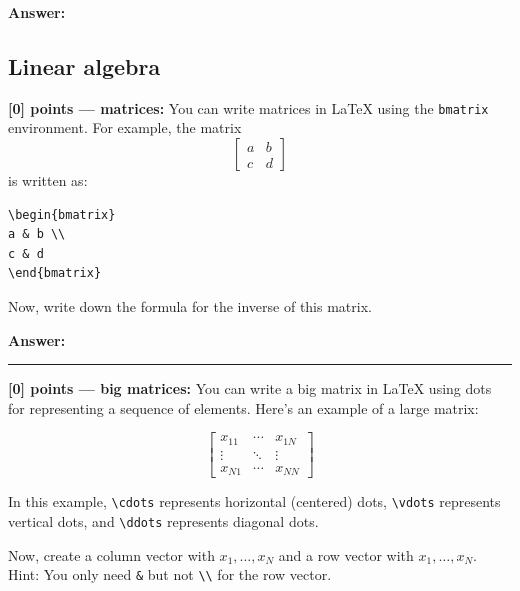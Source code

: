 \documentclass{article}
\newcommand{\mydivider}{\vspace{1em}\hrule\vspace{1em}}
\begin{document}
\begin{tcolorbox}{}
\textbf{Answer: }


\end{tcolorbox}


\subsection{Linear algebra}

\noindent\textbf{[0] points --- matrices:} You can write matrices in LaTeX using the \verb|bmatrix| environment. For example, the matrix
\[
\begin{bmatrix}
a & b \\
c & d
\end{bmatrix}
\]
is written as:

\begin{verbatim}
\begin{bmatrix}
a & b \\
c & d
\end{bmatrix}
\end{verbatim}

Now, write down the formula for the inverse of this matrix.

\begin{tcolorbox}{}
\textbf{Answer: }


\end{tcolorbox}



\mydivider

\noindent\textbf{[0] points --- big matrices:} You can write a big matrix in LaTeX using dots for representing a sequence of elements. Here's an example of a large matrix:

\[
\begin{bmatrix}
x_{11} & \cdots & x_{1N} \\
\vdots & \ddots & \vdots \\
x_{N1} & \cdots & x_{NN}
\end{bmatrix}
\]

In this example, \verb|\cdots| represents horizontal (centered) dots, \verb|\vdots| represents vertical dots, and \verb|\ddots| represents diagonal dots.

Now, create a column vector with $x_1, \ldots, x_N$ and a row vector with $x_1, \ldots, x_N$. Hint: You only need \verb|&| but not \verb|\\| for the row vector.
\end{document}
